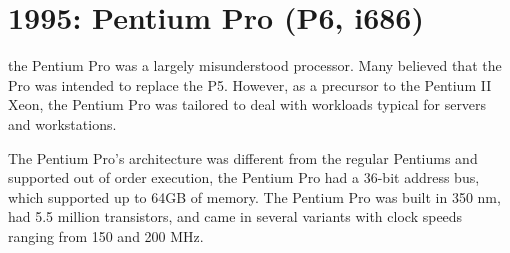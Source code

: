 




\hypertarget{pentium-pro-p6-i686}{%
\section{1995: Pentium Pro (P6, i686)}\label{pentium-pro-p6-i686}}

the Pentium Pro was a largely misunderstood processor. Many believed
that the Pro was intended to replace the P5. However, as a precursor to
the Pentium II Xeon, the Pentium Pro was tailored to deal with workloads
typical for servers and workstations.

The Pentium Pro's architecture was different from the regular Pentiums
and supported out of order execution, the Pentium Pro had a 36-bit
address bus, which supported up to 64GB of memory. The Pentium Pro was
built in 350 nm, had 5.5 million transistors, and came in several
variants with clock speeds ranging from 150 and 200 MHz.

